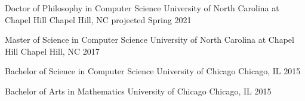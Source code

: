 
\begin{cventries}
  \cventry
    {Doctor of Philosophy in Computer Science} %
    {University of North Carolina at Chapel Hill} %
    {Chapel Hill, NC} %
    {projected Spring 2021} %
    {}

  \cventry
    {Master of Science in Computer Science} %
    {University of North Carolina at Chapel Hill} %
    {Chapel Hill, NC} %
    {2017} %
    {}

  \cventry
    {Bachelor of Science in Computer Science} %
    {University of Chicago} %
    {Chicago, IL} %
    {2015} %
    {}

  \cventry
    {Bachelor of Arts in Mathematics} %
    {University of Chicago} %
    {Chicago, IL} %
    {2015} %
    {}
\end{cventries}
